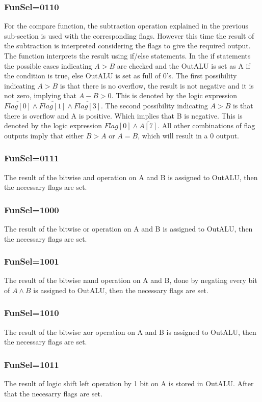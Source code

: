 \documentclass[pdftex,12pt,a4paper]{article}
\begin{document}
\subsubsection{FunSel=0110}
For the compare function, the subtraction operation explained in the previous sub-section is used with the corresponding flags.
However this time the result of the subtraction is interpreted considering the flags to give the required output.
The function interprets the result using if/else statements. In the if statements the possible cases indicating $A>B$ are checked
and the OutALU is set as A if the condition is true, else OutALU is set as full of 0's.
\newline
The first possibility indicating $A>B$ is that there is no overflow, the result is not negative and it is not zero, implying that
$A-B>0$. This is denoted by the logic expression $\overline{Flag[0]}\land\overline{Flag[1]}\land\overline{Flag[3]}$.
\newline
The second possibility indicating $A>B$ is that there is overflow and A is positive. Which implies that B is negative. 
This is denoted by the logic expression $Flag[0]\land\overline{A[7]}$.
\newline
All other combinations of flag outputs imply that either $B>A$ or $A=B$, which will result in a 0 output.
\subsubsection{FunSel=0111}
The result of the bitwise and operation on A and B is assigned to OutALU, then the necessary flags are set. 
\subsubsection{FunSel=1000}
The result of the bitwise or operation on A and B is assigned to OutALU, then the necessary flags are set. 
\subsubsection{FunSel=1001}
The result of the bitwise nand operation on A and B, done by negating every bit of $A\land B$ is assigned to OutALU, then the 
necessary flags are set. 
\subsubsection{FunSel=1010}
The result of the bitwise xor operation on A and B is assigned to OutALU, then the necessary flags are set. 
\subsubsection{FunSel=1011}
The result of logic shift left operation by 1 bit on A is stored in OutALU. After that the necesarry flags are set. 
\end{document}
